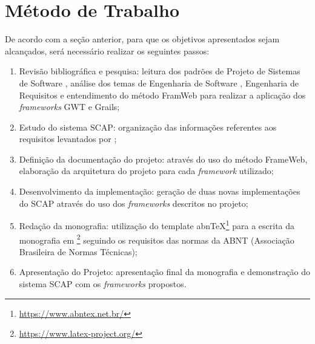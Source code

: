 
\section{Método de Trabalho}
\label{sec-metodo}


	
	

De acordo com a seção anterior, para que os objetivos apresentados sejam alcançados, será necessário realizar os seguintes passos:

\begin{enumerate}

    \item Revisão bibliográfica e pesquisa: leitura dos padrões de Projeto de Sistemas de Software \cite{falbo:pss18}, análise dos temas de Engenharia de Software \cite{falbo:es14}, Engenharia de Requisitos \cite{falbo:er17} e entendimento do método FramWeb \cite{souza:masterthesis07} para realizar a aplicação dos \textit{frameworks} GWT e Grails;
    \item Estudo do sistema SCAP: organização das informações referentes aos requisitos levantados por ;
    \item Definição da documentação do projeto: através do uso do método FrameWeb, elaboração da arquitetura do projeto para cada \textit{framework} utilizado;
    \item Desenvolvimento da implementação: geração de duas novas implementações do SCAP através do uso dos \textit{frameworks} descritos no projeto; 
    \item Redação da monografia: utilização do template abnTeX\footnote{\url{https://www.abntex.net.br/}} para a escrita da monografia em \latex\footnote{\url{https://www.latex-project.org/}} seguindo os requisitos das normas da ABNT (Associação Brasileira de Normas Técnicas);
    \item Apresentação do Projeto: apresentação final da monografia e demonstração do sistema SCAP com os \textit{frameworks} propostos.

\end{enumerate}    
    